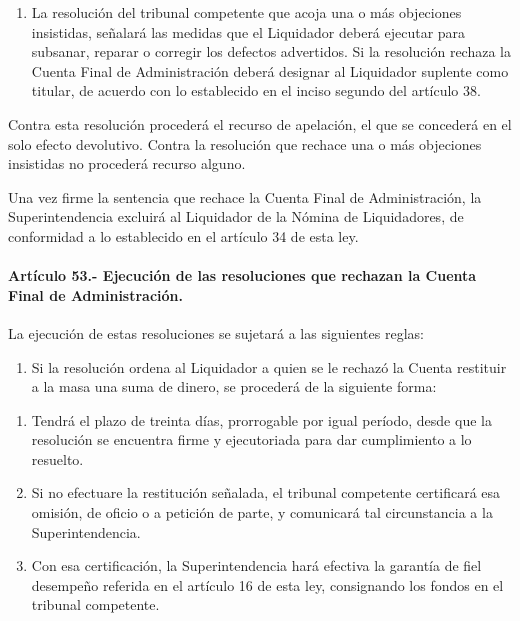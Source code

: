 \documentclass[
]{book}
\providecommand{\tightlist}{%
  \setlength{\itemsep}{0pt}\setlength{\parskip}{0pt}}
\begin{document}
\begin{enumerate}
\item
  La resolución del tribunal competente que acoja una o más objeciones insistidas, señalará las medidas que el Liquidador deberá ejecutar para subsanar, reparar o corregir los defectos advertidos. Si la resolución rechaza la Cuenta Final de Administración deberá designar al Liquidador suplente como titular, de acuerdo con lo establecido en el inciso segundo del artículo 38.
\end{enumerate}

Contra esta resolución procederá el recurso de apelación, el que se concederá en el solo efecto devolutivo. Contra la resolución que rechace una o más objeciones insistidas no procederá recurso alguno.

Una vez firme la sentencia que rechace la Cuenta Final de Administración, la Superintendencia excluirá al Liquidador de la Nómina de Liquidadores, de conformidad a lo establecido en el artículo 34 de esta ley.

\hypertarget{artuxedculo-53.--ejecuciuxf3n-de-las-resoluciones-que-rechazan-la-cuenta-final-de-administraciuxf3n.}{%
\paragraph*{Artículo 53.- Ejecución de las resoluciones que rechazan la Cuenta Final de Administración.}\label{artuxedculo-53.--ejecuciuxf3n-de-las-resoluciones-que-rechazan-la-cuenta-final-de-administraciuxf3n.}}

La ejecución de estas resoluciones se sujetará a las siguientes reglas:

\begin{enumerate}
\def\labelenumi{\arabic{enumi})}
\tightlist
\item
  Si la resolución ordena al Liquidador a quien se le rechazó la Cuenta restituir a la masa una suma de dinero, se procederá de la siguiente forma:
\end{enumerate}

\begin{enumerate}
\def\labelenumi{\alph{enumi})}
\item
  Tendrá el plazo de treinta días, prorrogable por igual período, desde que la resolución se encuentra firme y ejecutoriada para dar cumplimiento a lo resuelto.
\item
  Si no efectuare la restitución señalada, el tribunal competente certificará esa omisión, de oficio o a petición de parte, y comunicará tal circunstancia a la Superintendencia.
\item
  Con esa certificación, la Superintendencia hará efectiva la garantía de fiel desempeño referida en el artículo 16 de esta ley, consignando los fondos en el tribunal competente.
\end{enumerate}
\end{document}
